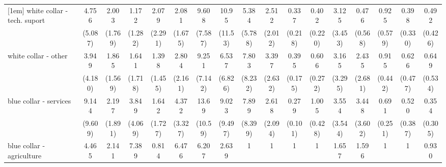 {\begin{tabular}{l*{16}{c}}
[1em]
white collar - tech. suport&       4.756         &       2.003         &       1.172         &       2.079         &       2.081         &       9.608\sym{**} &       10.95\sym{*}  &       5.384         &       2.512         &       0.337         &       0.402         &       3.125         &       0.476         &       0.925         &       0.398         &       0.492         \\
                    &     (5.087)         &     (1.769)         &     (1.282)         &     (2.291)         &     (1.675)         &     (7.587)         &     (11.53)         &     (5.788)         &     (2.012)         &     (0.218)         &     (0.220)         &     (3.453)         &     (0.568)         &     (0.579)         &     (0.330)         &     (0.426)         \\
[1em]
white collar - other&       3.949         &       1.865         &       1.641         &       1.398         &       2.804         &       9.251\sym{**} &       6.537         &       7.803         &       3.397         &       0.395\sym{*}  &       0.606         &       3.165         &       2.435         &       0.915         &       0.626         &       0.649         \\
                    &     (4.180)         &     (1.569)         &     (1.718)         &     (1.455)         &     (2.161)         &     (7.142)         &     (6.826)         &     (8.232)         &     (2.632)         &     (0.175)         &     (0.272)         &     (3.295)         &     (2.681)         &     (0.442)         &     (0.477)         &     (0.534)         \\
[1em]
blue collar - services&       9.144\sym{*}  &       2.197         &       3.849         &       1.642         &       4.372         &       13.69\sym{***}&       9.023\sym{*}  &       7.899         &       2.618         &       0.279\sym{***}&       1.005         &       3.554         &       3.448         &       0.691         &       0.520         &       0.354         \\
                    &     (9.609)         &     (1.891)         &     (4.069)         &     (1.727)         &     (3.327)         &     (10.59)         &     (9.497)         &     (8.399)         &     (2.094)         &     (0.101)         &     (0.428)         &     (3.544)         &     (3.602)         &     (0.251)         &     (0.387)         &     (0.305)         \\
[1em]
blue collar - agriculture&       4.465         &       2.141         &       7.389         &       0.814         &       6.476         &       6.207         &       2.639         &           1         &           1         &           1         &           1         &       1.657         &       1.596         &           1         &           1         &       0.930         \\

\end{tabular}}
